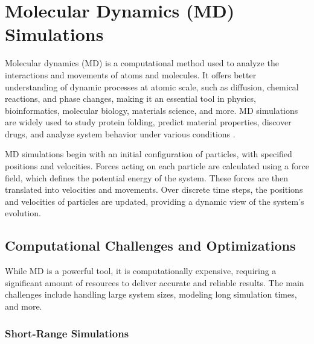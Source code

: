 
\section{Molecular Dynamics (MD) Simulations}

Molecular dynamics (MD) is a computational method used to analyze the interactions and movements of atoms and molecules. It offers better understanding of dynamic processes at atomic scale, such as diffusion, chemical reactions, and phase changes, making it an essential tool in physics, bioinformatics, molecular biology, materials science, and more. MD simulations are widely used to study protein folding, predict material properties, discover drugs, and analyze system behavior under various conditions \parencite{kukol2008molecular} \parencite{aktulga2012parallel}.

MD simulations begin with an initial configuration of particles, with specified positions and velocities. Forces acting on each particle are calculated using a force field, which defines the potential energy of the system. These forces are then translated into velocities and movements. Over discrete time steps, the positions and velocities of particles are updated, providing a dynamic view of the system's evolution.


\subsection{Computational Challenges and Optimizations}

While MD is a powerful tool, it is computationally expensive, requiring a significant amount of resources to deliver accurate and reliable results. The main challenges include handling large system sizes, modeling long simulation times, and more.

\subsubsection{Short-Range Simulations} \label{sec:shortrange}

